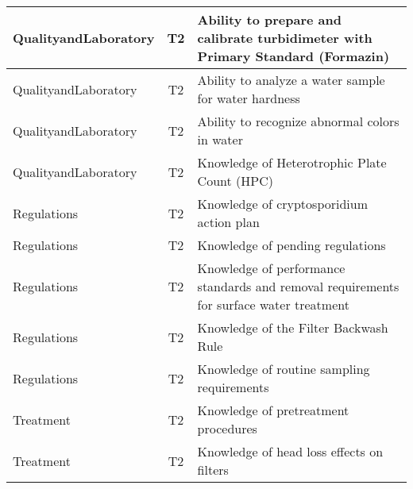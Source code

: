\documentclass{article}
\begin{document}
\begin{table}[]
\begin{tabular}{|l|c|l|}
QualityandLaboratory                   & T2             & Ability to prepare   and calibrate turbidimeter with Primary Standard (Formazin)                                                  \\ \hline
QualityandLaboratory                   & T2             & Ability to analyze a   water sample for water hardness                                                                            \\ \hline
QualityandLaboratory                   & T2             & Ability to recognize   abnormal colors in water                                                                                   \\ \hline
QualityandLaboratory                   & T2             & Knowledge of   Heterotrophic Plate Count (HPC)                                                                                    \\ \hline
Regulations                            & T2             & Knowledge of   cryptosporidium action plan                                                                                        \\ \hline
Regulations                            & T2             & Knowledge of pending   regulations                                                                                                \\ \hline
Regulations                            & T2             & Knowledge of   performance standards and removal requirements for surface water treatment                                         \\ \hline
Regulations                            & T2             & Knowledge of the   Filter Backwash Rule                                                                                           \\ \hline
Regulations                            & T2             & Knowledge of routine   sampling requirements                                                                                      \\ \hline
Treatment                              & T2             & Knowledge of   pretreatment procedures                                                                                            \\ \hline
Treatment                              & T2             & Knowledge of head   loss effects on filters                                                                                       \\ \hline

\end{tabular}
\end{table}
\end{document}
